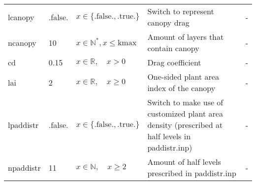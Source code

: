 \documentclass[twoside,11pt,fleqn,a4paper,english,openright]{report}
\begin{document}
\begin{center}
  \tabletail{
        &&&&\\\hline
  }
  \tablelasttail{
        &&&&\\\hline
  }
\begin{supertabular}{|l|p{1.5cm}|p{3.5cm}|p{6cm}|l|}
  lcanopy	& .false.	& $x\in\{\text{.false.},\text{.true.}\}$		& Switch to represent canopy drag	& -\\
  ncanopy	& 10		& $x \in \mathbb{N}^*, x \leq \text{kmax}$		& Amount of layers that contain canopy	& -\\
  cd		& 0.15		& $x \in \mathbb{R}, \quad x > 0$				& Drag coefficient	& -\\
  lai		& 2			& $x \in \mathbb{R}, \quad x\geq 0$				& One-sided plant area index of the canopy	& -\\
  lpaddistr	& .false.	& $x\in\{\text{.false.},\text{.true.}\}$		& Switch to make use of customized plant area density (prescribed at half levels in paddistr.inp)	& -\\
  npaddistr & 11		& $x \in \mathbb{N}, \quad x \geq 2$			& Amount of half levels prescribed in paddistr.inp	& -\\

\end{supertabular}
\end{center}
\end{document}
